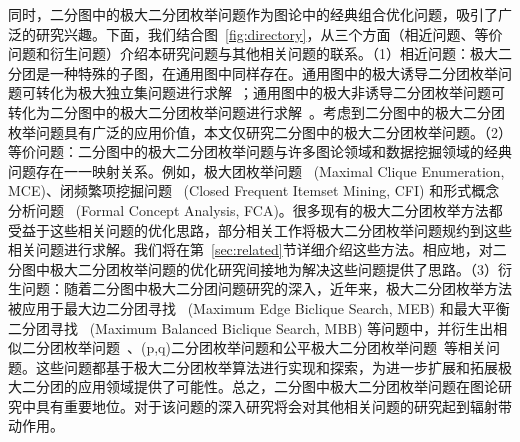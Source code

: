同时，二分图中的极大二分团枚举问题作为图论中的经典组合优化问题，吸引了广泛的研究兴趣。下面，我们结合图~\ref{fig:directory}，从三个方面（相近问题、等价问题和衍生问题）介绍本研究问题与其他相关问题的联系。（1）相近问题：极大二分团是一种特殊的子图，在通用图中同样存在。通用图中的极大诱导二分团枚举问题可转化为极大独立集问题进行求解~\cite{MBE-induced21}；通用图中的极大非诱导二分团枚举问题可转化为二分图中的极大二分团枚举问题进行求解~\cite{Proof09}。考虑到二分图中的极大二分团枚举问题具有广泛的应用价值，本文仅研究二分图中的极大二分团枚举问题。（2）等价问题：二分图中的极大二分团枚举问题与许多图论领域和数据挖掘领域的经典问题存在一一映射关系。例如，极大团枚举问题~\cite{MCE20,MCE-GPU21,MCE22} (Maximal Clique Enumeration, MCE)、闭频繁项挖掘问题~\cite{CFI98,CFI22} (Closed Frequent Itemset Mining, CFI) 和形式概念分析问题~\cite{FCA21,FCA22} (Formal Concept Analysis, FCA)。很多现有的极大二分团枚举方法都受益于这些相关问题的优化思路，部分相关工作将极大二分团枚举问题规约到这些相关问题进行求解。我们将在第~\ref{sec:related}节详细介绍这些方法。相应地，对二分图中极大二分团枚举问题的优化研究间接地为解决这些问题提供了思路。（3）衍生问题：随着二分图中极大二分团问题研究的深入，近年来，极大二分团枚举方法被应用于最大边二分团寻找~\cite{MEB20,MEB22} (Maximum Edge Biclique Search, MEB) 和最大平衡二分团寻找~\cite{MBB21} (Maximum Balanced Biclique Search, MBB) 等问题中，并衍生出相似二分团枚举问题~\cite{SimilarMBE22}、(p,q)二分团枚举问题\cite{PQ21}和公平极大二分团枚举问题~\cite{FairMBE23}等相关问题。这些问题都基于极大二分团枚举算法进行实现和探索，为进一步扩展和拓展极大二分团的应用领域提供了可能性。总之，二分图中极大二分团枚举问题在图论研究中具有重要地位。对于该问题的深入研究将会对其他相关问题的研究起到辐射带动作用。



